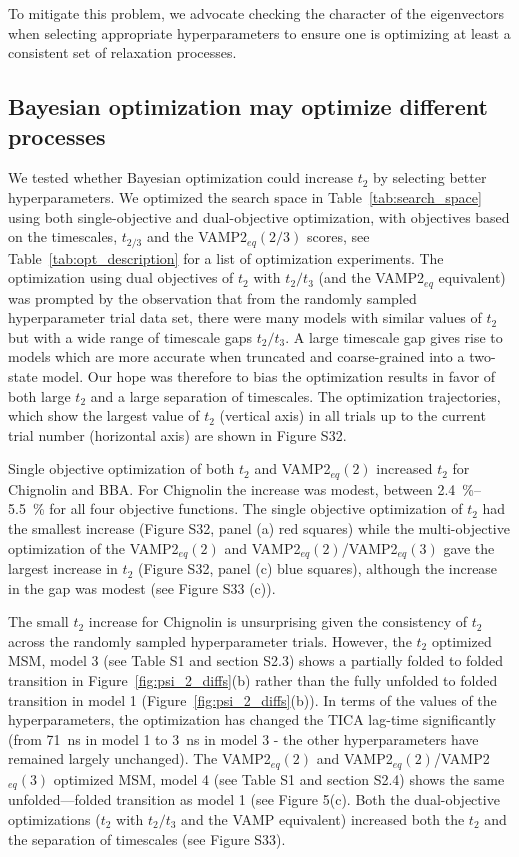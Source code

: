 \documentclass[journal=jacsat,manuscript=article]{achemso}
\begin{document}
To mitigate this problem, we advocate checking the character of the eigenvectors when selecting appropriate hyperparameters to ensure one is optimizing at least a consistent set of relaxation processes.  

\subsection{Bayesian optimization may optimize different processes}

We tested whether Bayesian optimization could increase $t_2$ by selecting better hyperparameters.  We optimized the search space in Table~\ref{tab:search_space} using both single-objective and dual-objective optimization, with objectives based on the timescales, $t_{2/3}$ and the VAMP2$_{eq}(2/3)$ scores, see Table~\ref{tab:opt_description} for a list of optimization experiments.  The optimization using dual objectives of $t_2$ with $t_2/t_3$ (and the VAMP2$_{eq}$ equivalent) was prompted by the observation that from the randomly sampled hyperparameter trial data set, there were many models with similar values of $t_2$ but with a wide range of timescale gaps $t_2/t_3$. A large timescale gap gives rise to models which are more accurate when truncated and coarse-grained into a two-state model. Our hope was therefore to bias the optimization results in favor of both large $t_2$ and a large separation of timescales. The optimization trajectories, which show the largest value of $t_2$ (vertical axis) in all trials up to the current trial number (horizontal axis) are shown in Figure S32.  

Single objective optimization of both $t_2$ and VAMP2$_{eq}(2)$ increased $t_2$ for Chignolin and BBA. For Chignolin the increase was modest, between \SIrange[range-phrase=---]{2.4}{5.5}{\percent} for all four objective functions. The single objective optimization of $t_2$ had the smallest increase (Figure S32, panel (a) red squares) while the multi-objective optimization of the VAMP2$_{eq}(2)$ and VAMP2$_{eq}(2)$/VAMP2$_{eq}(3)$ gave the largest increase in $t_2$ (Figure S32, panel (c) blue squares), although the increase in the gap was modest (see Figure S33 (c)). 
 
The small $t_2$ increase for Chignolin is unsurprising given the consistency of $t_2$ across the randomly sampled hyperparameter trials.  However, the $t_2$ optimized MSM, model 3 (see Table S1 and section S2.3) shows a partially folded to folded transition in Figure~\ref{fig:psi_2_diffs}(b) rather than the fully unfolded to folded transition in model 1 (Figure~\ref{fig:psi_2_diffs}(b)).  In terms of the values of the hyperparameters, the optimization has changed the TICA lag-time significantly (from \SI{71}{\nano\second} in model 1 to \SI{3}{\nano\second} in model 3 - the other hyperparameters have remained largely unchanged). The VAMP2$_{eq}(2)$ and VAMP2$_{eq}(2)$/VAMP2$_{eq}(3)$ optimized MSM, model 4 (see Table S1 and section S2.4) shows the same unfolded---folded transition as model 1 (see Figure 5(c). Both the dual-objective optimizations ($t_2$ with $t_2/t_3$ and the VAMP equivalent) increased both the $t_2$ and the separation of timescales (see Figure S33). 
\end{document}
